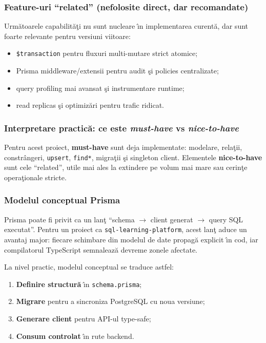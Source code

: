 \documentclass[12pt,onecolumn,draftclsnofoot]{IEEEtran}
\begin{document}
\subsubsection{Feature-uri \enquote{related} (nefolosite direct, dar recomandate)}
Urm\u{a}toarele capabilit\u{a}\c{t}i nu sunt nucleare \^{\i}n implementarea curent\u{a}, dar sunt foarte relevante pentru versiuni viitoare:
\begin{itemize}
  \item \texttt{\$transaction} pentru fluxuri multi-mutare strict atomice;
  \item Prisma middleware/extensii pentru audit \c{s}i policies centralizate;
  \item query profiling mai avansat \c{s}i instrumentare runtime;
  \item read replicas \c{s}i optimiz\u{a}ri pentru trafic ridicat.
\end{itemize}

\subsubsection{Interpretare practic\u{a}: ce este \textit{must-have} vs \textit{nice-to-have}}
Pentru acest proiect, \textbf{must-have} sunt deja implementate: modelare, rela\c{t}ii, constr\^{a}ngeri, \texttt{upsert}, \texttt{find*}, migra\c{t}ii \c{s}i singleton client. Elementele \textbf{nice-to-have} sunt cele \enquote{related}, utile mai ales la extindere pe volum mai mare sau cerin\c{t}e opera\c{t}ionale stricte.

\subsubsection{Modelul conceptual Prisma}
Prisma poate fi privit ca un lan\c{t} \enquote{schema $\rightarrow$ client generat $\rightarrow$ query SQL executat}. Pentru un proiect ca \texttt{sql-learning-platform}, acest lan\c{t} aduce un avantaj major: fiecare schimbare din modelul de date propag\u{a} explicit \^{\i}n cod, iar compilatorul TypeScript semnaleaz\u{a} devreme zonele afectate.

La nivel practic, modelul conceptual se traduce astfel:
\begin{enumerate}[label=\arabic*)]
  \item \textbf{Definire structur\u{a}} \^{\i}n \texttt{schema.prisma};
  \item \textbf{Migrare} pentru a sincroniza PostgreSQL cu noua versiune;
  \item \textbf{Generare client} pentru API-ul type-safe;
  \item \textbf{Consum controlat} \^{\i}n rute backend.
\end{enumerate}
\end{document}
